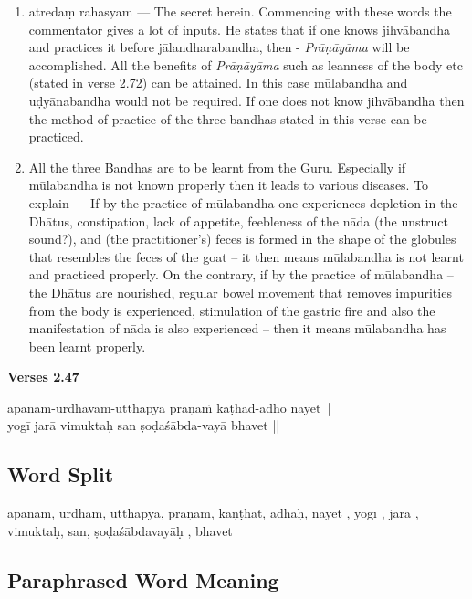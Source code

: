 \begin{enumerate}
\itemsep=0pt
\item atredaṃ rahasyam --- The secret herein. Commencing with these words the commentator gives a lot of inputs. He states that if one knows jihvābandha and practices it before jālandharabandha, then - \textit{Prāṇāyāma} will be accomplished. All the benefits of \textit{Prāṇāyāma} such as leanness of the body etc (stated in verse 2.72) can be attained. In this case mūlabandha and uḍyānabandha would not be required. If one does not know jihvābandha then the method of practice of the three bandhas stated in this verse can be practiced. 
\item All the three Bandhas are to be learnt from the Guru. Especially if mūlabandha is not known properly then it leads to various diseases. To explain --- If by the practice of  mūlabandha one experiences depletion in the Dhātus, constipation, lack of appetite, feebleness of the nāda (the unstruct sound?), and (the practitioner’s) feces is formed in the shape of the globules that resembles the feces of the goat – it then means mūlabandha is not learnt and practiced properly. On the contrary, if by the practice of mūlabandha – the Dhātus are nourished, regular bowel movement that removes impurities from the body is experienced, stimulation of the gastric fire and also the manifestation of nāda is also experienced – then it means mūlabandha has been learnt properly.
\end{enumerate}
\vspace{-5pt}


\noindent \textbf{Verses 2.47}
\vspace{-5pt}

\begin{shloka}
apānam-ūrdhavam-utthāpya prāṇaṁ kaṭhād-adho nayet |\\
yogī jarā vimuktaḥ san ṣoḍaśābda-vayā bhavet ||
\end{shloka}

\subsection*{Word Split}
\vspace{-10pt}

apānam, ūrdham, utthāpya, prāṇam, kaṇṭhāt, adhaḥ, nayet , yogī , jarā , vimuktaḥ, san, ṣoḍaśābdavayāḥ , bhavet

\subsection*{Paraphrased Word Meaning}
\vspace{-10pt}

